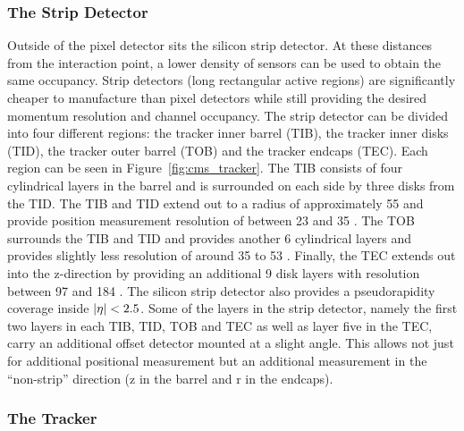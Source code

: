 \subsubsection{The Strip Detector}
\label {sec:cms_silicon_strip}

Outside of the pixel detector sits the silicon strip detector. At these
distances from the interaction point, a lower density of sensors can be
used to obtain the same occupancy. Strip detectors (long rectangular
active regions) are significantly cheaper to manufacture than pixel detectors
while still providing the desired momentum resolution and channel occupancy.
The strip detector can be divided into four different regions: the tracker
inner barrel (TIB), the tracker inner disks (TID), the tracker outer
barrel (TOB) and the tracker endcaps (TEC). Each region can be seen in
Figure~\ref{fig:cms_tracker}. The TIB consists of four cylindrical layers
in the barrel and is surrounded on each side by three disks from the TID. The
TIB and TID extend out to a radius of approximately 55 \cm and provide
position measurement resolution of between 23 and 35 \um. The TOB surrounds the
TIB and TID and provides another 6 cylindrical layers and provides slightly
less resolution of around 35 to 53 \um. Finally, the TEC extends out into the
z-direction by providing an additional 9 disk layers with resolution between 97
and 184 \um. The silicon strip detector also provides a pseudorapidity coverage
inside $\left|\eta\right| < 2.5$. Some of the layers in the strip detector, namely the first
two layers in each TIB, TID, TOB and TEC as well as layer five in the TEC,
carry an additional offset detector mounted at a slight angle. This allows not
just for additional positional measurement but an additional measurement in the
``non-strip'' direction (z in the barrel and r in the endcaps).

\subsubsection{The Tracker}
\label {sec:cms_silicon_tracker}

